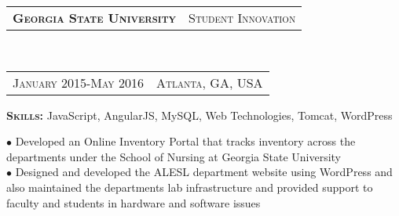 \documentclass[10pt,a4paper,oneside]{article}
\begin{document}
    \begin{minipage}[t]{0.4\textwidth}
        \vspace{0pt}
        
        \begin{tabular}{c|c}
            \textbf{\normalsize G\textsc{eorgia} S\textsc{tate} U\textsc{niversity}}
            &\textmd{\normalsize S\textsc{tudent} I\textsc{nnovation}}
        \end{tabular}\\
        \textcolor{light-gray}{
            \begin{tabular}{c|c}
                {\small J\textsc{anuary 2015}-M\textsc{ay 2016}}
                &{\small A\textsc{tlanta}, G\textsc{A}, U\textsc{SA}}
            \end{tabular}
        }
        \vspace{2mm}
        \begin{adjustwidth}{7pt}{0pt}
            \textbf{S\textsc{kills: }} \small{JavaScript, AngularJS, MySQL, Web Technologies, Tomcat, WordPress}
        \end{adjustwidth}
        \vspace{1mm}
        \begin{adjustwidth}{7pt}{0pt}
            {\footnotesize $\bullet$ Developed an Online Inventory Portal that tracks inventory across the departments under the School of Nursing at Georgia State University \\
            $\bullet$ Designed and developed the ALESL department website using WordPress and also maintained the departments lab infrastructure and provided support to faculty and students in hardware and software issues}\\
        \end{adjustwidth}        
        

\end{minipage}
\end{document}
